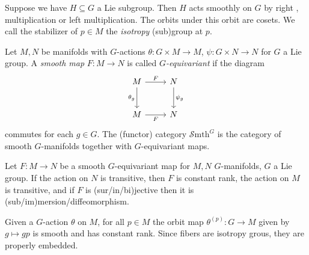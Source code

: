 
Suppose we have $H\subseteq G$ a Lie subgroup. Then $H$ acts smoothly on $G$ by right , multiplication or left multiplication. The orbits under this orbit are cosets. We call the stabilizer of $p\in M$ the \emph{isotropy} (sub)group at $p$.

\begin{definition}\label{3.0.18}
	Let $M,N$ be manifolds with $G$-actions $\theta :G\times M\to M$, $\psi :G\times N\to N$ for $G$ a Lie group. A \emph{smooth map} $F : M \to N$ is called $G$\emph{-equivariant} if the diagram
	\[\begin{tikzcd}[row sep = 2.5em, column sep = 2.5em]
	M \ar[" F ", r] \ar[" \theta _g "', d]  & N \ar[" \psi _g ", d]  \\
	M \ar[" F "', r]  & N
	\end{tikzcd}\]
	commutes for each $g\in G$. The (functor) category $\mathcal{S} \mathrm{mth}^G $ is the category of smooth $G$-manifolds together with $G$-equivariant maps.
\end{definition}


\begin{theorem}\label{3.0.19}
	Let $F : M \to N$ be a smooth $G$-equivariant map for $M,N$ $G$-manifolds, $G$ a Lie group. If the action on $N$ is transitive, then $F$ is constant rank, the action on $M$ is transitive, and if $F$ is (sur/in/bi)jective then it is (sub/im)mersion/diffeomorphism.
\end{theorem}

\begin{proposition}\label{3.0.20}
	Given a $G$-action $\theta $ on $M$, for all $p\in M$ the orbit map $\theta ^{(p)} : G \to M$ given by $g\mapsto gp$ is smooth and has constant rank. Since fibers are isotropy grous, they are properly embedded.
\end{proposition}

